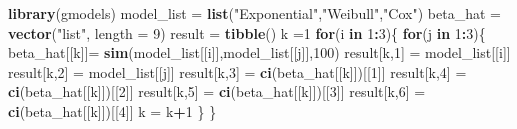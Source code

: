 \documentclass[]{article}
\newenvironment{Shaded}{\begin{snugshade}}{\end{snugshade}}
\newcommand{\KeywordTok}[1]{\textcolor[rgb]{0.13,0.29,0.53}{\textbf{#1}}}
\newcommand{\DataTypeTok}[1]{\textcolor[rgb]{0.13,0.29,0.53}{#1}}
\newcommand{\DecValTok}[1]{\textcolor[rgb]{0.00,0.00,0.81}{#1}}
\newcommand{\StringTok}[1]{\textcolor[rgb]{0.31,0.60,0.02}{#1}}
\newcommand{\ControlFlowTok}[1]{\textcolor[rgb]{0.13,0.29,0.53}{\textbf{#1}}}
\newcommand{\OperatorTok}[1]{\textcolor[rgb]{0.81,0.36,0.00}{\textbf{#1}}}
\newcommand{\NormalTok}[1]{#1}
\begin{document}
\begin{Shaded}
\begin{Highlighting}[]
\KeywordTok{library}\NormalTok{(gmodels)}
\NormalTok{model_list =}\StringTok{ }\KeywordTok{list}\NormalTok{(}\StringTok{"Exponential"}\NormalTok{,}\StringTok{"Weibull"}\NormalTok{,}\StringTok{"Cox"}\NormalTok{)}
\NormalTok{beta_hat =}\StringTok{ }\KeywordTok{vector}\NormalTok{(}\StringTok{"list"}\NormalTok{, }\DataTypeTok{length =} \DecValTok{9}\NormalTok{)}
\NormalTok{result =}\StringTok{ }\KeywordTok{tibble}\NormalTok{()}
\NormalTok{k =}\DecValTok{1}
\ControlFlowTok{for}\NormalTok{(i }\ControlFlowTok{in} \DecValTok{1}\OperatorTok{:}\DecValTok{3}\NormalTok{)\{}
  \ControlFlowTok{for}\NormalTok{(j }\ControlFlowTok{in} \DecValTok{1}\OperatorTok{:}\DecValTok{3}\NormalTok{)\{}
\NormalTok{  beta_hat[[k]]=}\StringTok{ }\KeywordTok{sim}\NormalTok{(model_list[[i]],model_list[[j]],}\DecValTok{100}\NormalTok{)}
\NormalTok{  result[k,}\DecValTok{1}\NormalTok{] =}\StringTok{ }\NormalTok{model_list[[i]]}
\NormalTok{  result[k,}\DecValTok{2}\NormalTok{] =}\StringTok{ }\NormalTok{model_list[[j]]}
\NormalTok{  result[k,}\DecValTok{3}\NormalTok{] =}\StringTok{ }\KeywordTok{ci}\NormalTok{(beta_hat[[k]])[[}\DecValTok{1}\NormalTok{]]}
\NormalTok{  result[k,}\DecValTok{4}\NormalTok{] =}\StringTok{ }\KeywordTok{ci}\NormalTok{(beta_hat[[k]])[[}\DecValTok{2}\NormalTok{]]}
\NormalTok{  result[k,}\DecValTok{5}\NormalTok{] =}\StringTok{ }\KeywordTok{ci}\NormalTok{(beta_hat[[k]])[[}\DecValTok{3}\NormalTok{]]}
\NormalTok{  result[k,}\DecValTok{6}\NormalTok{] =}\StringTok{ }\KeywordTok{ci}\NormalTok{(beta_hat[[k]])[[}\DecValTok{4}\NormalTok{]]}
\NormalTok{  k =}\StringTok{ }\NormalTok{k}\OperatorTok{+}\DecValTok{1}
\NormalTok{  \}}
\NormalTok{\}}
\end{Highlighting}
\end{Shaded}
\end{document}
